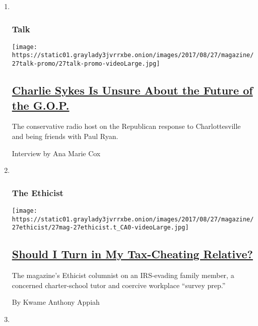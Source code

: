 \begin{enumerate}
\def\labelenumi{\arabic{enumi}.}
\item ~
  \hypertarget{talk}{%
  \subsubsection{Talk}\label{talk}}

  \texttt{[image: https://static01.graylady3jvrrxbe.onion/images/2017/08/27/magazine/27talk-promo/27talk-promo-videoLarge.jpg]}

  \hypertarget{charlie-sykes-is-unsure-about-the-future-of-the-gop}{%
  \subsection{\texorpdfstring{\href{/2017/08/21/magazine/charlie-sykes-is-unsure-about-the-future-of-the-gop.html}{Charlie
  Sykes Is Unsure About the Future of the
  G.O.P.}}{Charlie Sykes Is Unsure About the Future of the G.O.P.}}\label{charlie-sykes-is-unsure-about-the-future-of-the-gop}}

  The conservative radio host on the Republican response to
  Charlottesville and being friends with Paul Ryan.

  Interview by Ana Marie Cox
\item ~
  \hypertarget{the-ethicist}{%
  \subsubsection{The Ethicist}\label{the-ethicist}}

  \texttt{[image: https://static01.graylady3jvrrxbe.onion/images/2017/08/27/magazine/27ethicist/27mag-27ethicist.t\_CA0-videoLarge.jpg]}

  \hypertarget{should-i-turn-in-my-tax-cheating-relative}{%
  \subsection{\texorpdfstring{\href{/2017/08/22/magazine/should-i-turn-in-my-tax-cheating-relative.html}{Should
  I Turn in My Tax-Cheating
  Relative?}}{Should I Turn in My Tax-Cheating Relative?}}\label{should-i-turn-in-my-tax-cheating-relative}}

  The magazine's Ethicist columnist on an IRS-evading family member, a
  concerned charter-school tutor and coercive workplace ``survey prep.''

  By Kwame Anthony Appiah
\item ~
  \hypertarget{new-sentences}{%
}
\end{enumerate}
